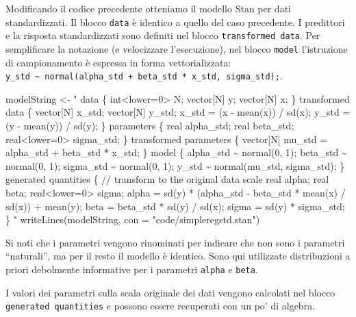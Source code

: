 \documentclass[
  11pt,
]{krantz}
\makeatletter
\newenvironment{Shaded}{\begin{snugshade}}{\end{snugshade}}
\newcommand{\AttributeTok}[1]{\textcolor[rgb]{0.61,0.61,0.61}{#1}}
\newcommand{\FunctionTok}[1]{\textcolor[rgb]{0,0,0}{#1}}
\newcommand{\NormalTok}[1]{#1}
\newcommand{\OtherTok}[1]{\textcolor[rgb]{0.37,0.37,0.37}{#1}}
\newcommand{\StringTok}[1]{\textcolor[rgb]{0.5,0.5,0.5}{#1}}
\newenvironment{kframe}{%
\medskip{}
\setlength{\fboxsep}{.8em}
 \def\at@end@of@kframe{}%
 \ifinner\ifhmode%
  \def\at@end@of@kframe{\end{minipage}}%
  \begin{minipage}{\columnwidth}%
 \fi\fi%
 \def\FrameCommand##1{\hskip\@totalleftmargin \hskip-\fboxsep
 \colorbox{shadecolor}{##1}\hskip-\fboxsep
     \hskip-\linewidth \hskip-\@totalleftmargin \hskip\columnwidth}%
 \MakeFramed {\advance\hsize-\width
   \@totalleftmargin\z@ \linewidth\hsize
   \@setminipage}}%
 {\par\unskip\endMakeFramed%
 \at@end@of@kframe}
\renewenvironment{Shaded}{\begin{kframe}}{\end{kframe}}
\theoremstyle{definition}
\theoremstyle{definition}
\theoremstyle{definition}
\theoremstyle{definition}
\theoremstyle{remark}
\makeatother
\begin{document}
Modificando il codice precedente otteniamo il modello Stan per dati standardizzati. Il blocco \texttt{data} è identico a quello del caso precedente. I predittori e la risposta standardizzati sono definiti nel blocco \texttt{transformed\ data}. Per semplificare la notazione (e velocizzare l'esecuzione), nel blocco \texttt{model} l'istruzione di campionamento è espressa in forma vettorializzata: \texttt{y\_std\ \textasciitilde{}\ normal(alpha\_std\ +\ beta\_std\ *\ x\_std,\ sigma\_std);}.

\begin{Shaded}
\begin{Highlighting}[]
\NormalTok{modelString }\OtherTok{\textless{}{-}} \StringTok{"}
\StringTok{data \{}
\StringTok{  int\textless{}lower=0\textgreater{} N;}
\StringTok{  vector[N] y;}
\StringTok{  vector[N] x;}
\StringTok{\}}
\StringTok{transformed data \{}
\StringTok{  vector[N] x\_std;}
\StringTok{  vector[N] y\_std;}
\StringTok{  x\_std = (x {-} mean(x)) / sd(x);}
\StringTok{  y\_std = (y {-} mean(y)) / sd(y);}
\StringTok{\}}
\StringTok{parameters \{}
\StringTok{  real alpha\_std;}
\StringTok{  real beta\_std;}
\StringTok{  real\textless{}lower=0\textgreater{} sigma\_std;}
\StringTok{\}}
\StringTok{transformed parameters \{}
\StringTok{  vector[N] mu\_std = alpha\_std + beta\_std * x\_std;}
\StringTok{\}}
\StringTok{model \{}
\StringTok{  alpha\_std \textasciitilde{} normal(0, 1);}
\StringTok{  beta\_std \textasciitilde{} normal(0, 1);}
\StringTok{  sigma\_std \textasciitilde{} normal(0, 1);}
\StringTok{  y\_std \textasciitilde{} normal(mu\_std, sigma\_std);}
\StringTok{\}}
\StringTok{generated quantities \{}
\StringTok{  // transform to the original data scale}
\StringTok{  real alpha;}
\StringTok{  real beta;}
\StringTok{  real\textless{}lower=0\textgreater{} sigma;}
\StringTok{  alpha = sd(y) * (alpha\_std {-} beta\_std * mean(x) / sd(x)) + mean(y);}
\StringTok{  beta = beta\_std * sd(y) / sd(x);}
\StringTok{  sigma = sd(y) * sigma\_std;}
\StringTok{\}}
\StringTok{"}
\FunctionTok{writeLines}\NormalTok{(modelString, }\AttributeTok{con =} \StringTok{"code/simpleregstd.stan"}\NormalTok{)}
\end{Highlighting}
\end{Shaded}

Si noti che i parametri vengono rinominati per indicare che non sono i parametri ``naturali'', ma per il resto il modello è identico. Sono qui utilizzate distribuzioni a priori debolmente informative per i parametri \texttt{alpha} e \texttt{beta}.

I valori dei parametri sulla scala originale dei dati vengono calcolati nel blocco \texttt{generated\ quantities} e possono essere recuperati con un po' di algebra.
\end{document}
